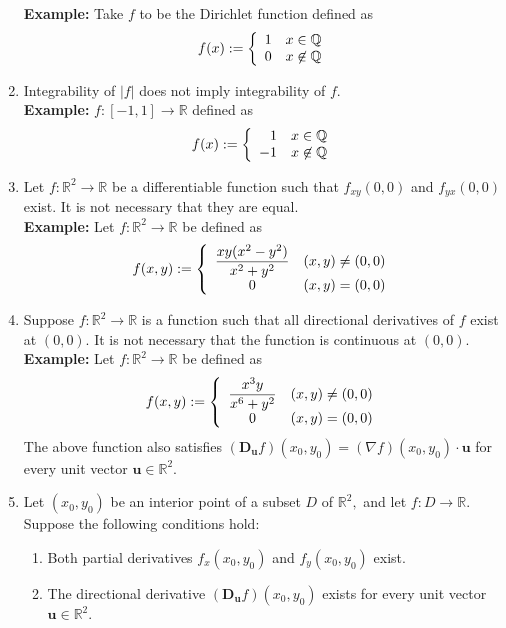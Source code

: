 \documentclass{article}
\begin{document}
\begin{enumerate}
	\textbf{Example:} Take $f$ to be the Dirichlet function defined as
	\[f(x) := \left\{
	\begin{array}{r c}
		1 & x \in \mathbb{Q}\\
		0 & x \not\in \mathbb{Q}		
	\end{array}
	\right.\]
	\item Integrability of $|f|$ does not imply integrability of $f.$\\
	\textbf{Example:} $f:[-1, 1] \to \mathbb{R}$ defined as
	\[f(x) := \left\{
	\begin{array}{r c}
		1 & x \in \mathbb{Q}\\
		-1 & x \not\in \mathbb{Q}		
	\end{array}
	\right.\]
	\item Let $f:\mathbb{R}^2\to\mathbb{R}$ be a differentiable function such that $f_{xy}(0, 0)$ and $f_{yx}(0, 0)$ exist. It is not necessary that they are equal.\\
	\textbf{Example:} Let $f:\mathbb{R}^2 \to \mathbb{R}$ be defined as
	\[f(x, y) := \left\{
	\begin{array}{c c}
		\dfrac{xy(x^2 - y^2)}{x^2 + y^2} & (x, y) \neq (0, 0)\\
		0 & (x, y) = (0, 0)	
	\end{array}
	\right.\]
	\item Suppose $f:\mathbb{R}^2\to\mathbb{R}$ is a function such that all directional derivatives of $f$ exist at $(0, 0).$ It is not necessary that the function is continuous at $(0, 0).$\\
	\textbf{Example:} Let $f:\mathbb{R}^2 \to \mathbb{R}$ be defined as
	\[f(x, y) := \left\{
	\begin{array}{c c}
		\dfrac{x^3y}{x^6 + y^2} & (x, y) \neq (0, 0)\\
		0 & (x, y) = (0, 0)	
	\end{array}
	\right.\]
	The above function also satisfies $(\mathbf{D_u}f)(x_0, y_0) = (\nabla f)(x_0, y_0)\cdot\mathbf{u}$ for every unit vector $\mathbf{u} \in \mathbb{R}^2.$
	\item Let $(x_0, y_0)$ be an interior point of a subset $D$ of $\mathbb{R}^2,$ and let $f:D\to\mathbb{R}.$ Suppose the following conditions hold:
	\begin{enumerate}[nosep] 
		\item Both partial derivatives $f_x(x_0,y_0)$ and $f_y(x_0, y_0)$ exist.
		\item The directional derivative $(\mathbf{D_u}f)(x_0, y_0)$ exists for every unit vector $\mathbf{u} \in \mathbb{R}^2.$

\end{enumerate}
\end{enumerate}
\end{document}
